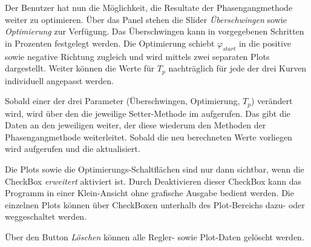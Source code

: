 Der Benutzer  hat nun die  M\"oglichkeit, die Resultate  der Phasengangmethode
weiter  zu  optimieren. \"Uber  das   Panel    stehen  die
Slider  \emph{\"Uberschwingen} sowie  \emph{Optimierung} zur  Verf\"ugung. Das
\"Uberschwingen  kann  in  vorgegebenen   Schritten  in  Prozenten  festgelegt
werden. Die  Optimierung  schiebt  $\varphi_{start}$  in  die  positive  sowie
negative   Richtung   zugleich  und   wird   mittels   zwei  separaten   Plots
dargestellt. Weiter k\"onnen  die Werte f\"ur $T_p$  nachtr\"aglich f\"ur jede
der drei Kurven individuell angepasst werden.

Sobald  einer   der  drei  Parameter  (\"Uberschwingen,   Optimierung,  $T_p$)
ver\"andert  wird,   wird  \"uber   den     die  jeweilige
Setter-Methode im  aufgerufen. Das   gibt die Daten an
den jeweiligen   weiter, der diese wiederum  den Methoden der
Phasengangmethode  weiterleitet. Sobald die  neu berechneten  Werte vorliegen
wird  aufgerufen und die  aktualisiert.

Die  Plots  sowie die  Optimierungs-Schaltfl\"achen  sind  nur dann  sichtbar,
wenn die  CheckBox \emph{erweitert}  aktiviert ist. Durch  Deaktivieren dieser
CheckBox  kann das  Programm  in einer  Klein-Ansicht  ohne grafische  Ausgabe
bedient werden. Die  einzelnen Plots k\"onnen \"uber  CheckBoxen unterhalb des
Plot-Bereichs dazu- oder weggeschaltet werden.

\"Uber  den Button  \emph{L\"oschen}  k\"onnen alle  Regler- sowie  Plot-Daten
gel\"oscht werden.
